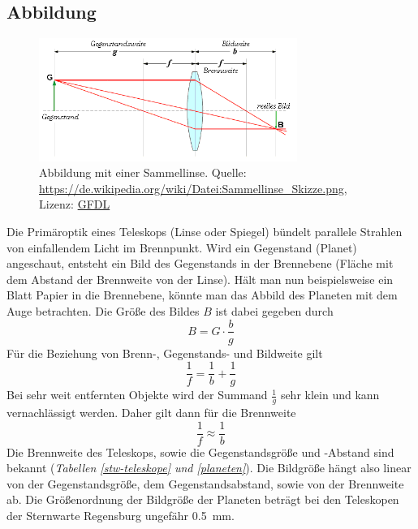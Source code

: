 \documentclass[10pt,a4paper,titlepage]{article}
\begin{document}
\subsection{Abbildung}
\label{sec:abbildung}
\begin{figure}[h!]
  \centering
    \includegraphics[width=0.75\textwidth]{Sammellinse}
  \caption{Abbildung mit einer Sammellinse. Quelle: \url{https://de.wikipedia.org/wiki/Datei:Sammellinse_Skizze.png}, Lizenz: \href{http://www.selflinux.org/selflinux/html/gfdl_de.html}{GFDL}}
  \label{fig:sammellinse}
\end{figure}
Die Primäroptik eines Teleskops (Linse oder Spiegel) bündelt parallele Strahlen von einfallendem Licht im Brennpunkt. Wird ein Gegenstand (Planet) angeschaut, entsteht ein Bild des Gegenstands in der Brennebene (Fläche mit dem Abstand der Brennweite von der Linse). Hält man nun beispielsweise ein Blatt Papier in die Brennebene, könnte man das Abbild des Planeten mit dem Auge betrachten. Die Größe des Bildes $B$ ist dabei gegeben durch
\begin{equation}
\label{eq:bildgroesse}
B = G \cdot \frac{b}{g}
\end{equation}
Für die Beziehung von Brenn-, Gegenstands- und Bildweite gilt
\begin{equation}
\frac{1}{f} = \frac{1}{b}+\frac{1}{g}
\end{equation}
Bei sehr weit entfernten Objekte wird der Summand $\frac{1}{g}$ sehr klein und kann vernachlässigt werden. Daher gilt dann für die Brennweite
\begin{equation}
\label{eq:b-f}
\frac{1}{f} \approx \frac{1}{b}
\end{equation}
Die Brennweite des Teleskops, sowie die Gegenstandsgröße und -Abstand sind bekannt (\textit{Tabellen \ref{stw-teleskope} und \ref{planeten}}). Die Bildgröße hängt also linear von der Gegenstandsgröße, dem Gegenstandsabstand, sowie von der Brennweite ab. Die Größenordnung der Bildgröße der Planeten beträgt bei den Teleskopen der Sternwarte Regensburg ungefähr \SI{0.5}{\mm}.
\end{document}
